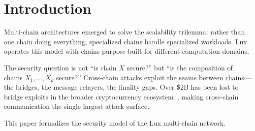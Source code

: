 \section{Introduction}


Multi-chain architectures emerged to solve the scalability trilemma: rather than one chain doing everything, specialized chains handle specialized workloads. Lux operates this model with chains purpose-built for different computation domains.

The security question is not ``is chain $X$ secure?'' but ``is the composition of chains $X_1, \ldots, X_k$ secure?'' Cross-chain attacks exploit the seams between chains---the bridges, the message relayers, the finality gaps. Over \$2B has been lost to bridge exploits in the broader cryptocurrency ecosystem~\cite{bridge-losses}, making cross-chain communication the single largest attack surface.

This paper formalizes the security model of the Lux multi-chain network.

